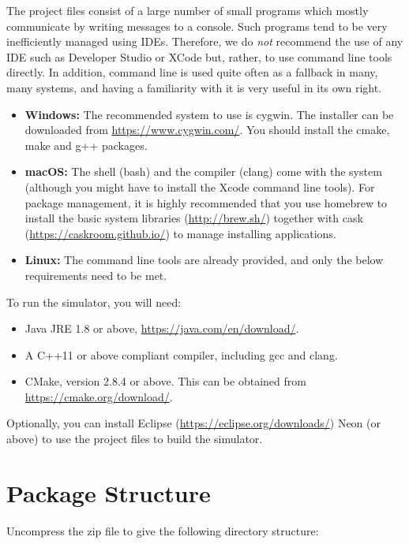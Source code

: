\documentclass[a4paper]{article}
\begin{document}
The project files consist of a large number of small programs which mostly
communicate by writing messages to a console. Such programs tend to be very
inefficiently managed using IDEs. Therefore, we do \emph{not\/} recommend the
use of any IDE such as Developer Studio or XCode but, rather, to use command
line tools directly. In addition, command line is used quite often as a fallback
in many, many systems, and having a familiarity with it is very useful in its
own right.

\begin{itemize}
\item {\bfseries Windows:} The recommended system to use is
  cygwin. The installer can be downloaded from
  \url{https://www.cygwin.com/}. You should install the cmake, make
  and g++ packages.
\item {\bfseries macOS:} The shell (bash) and the compiler (clang)
  come with the system (although you might have to install the Xcode
  command line tools). For package management, it is highly
  recommended that you use homebrew to install the basic system
  libraries (\url{http://brew.sh/}) together with cask
  (\url{https://caskroom.github.io/}) to manage installing
  applications.
\item {\bfseries Linux:} The command line tools are already provided,
  and only the below requirements need to be met.
\end{itemize}

To run the simulator, you will need:

\begin{itemize}
\item Java JRE 1.8 or above, \url{https://java.com/en/download/}.
\item A C++11 or above compliant compiler, including gcc and
  clang.
\item CMake, version 2.8.4 or above. This can be obtained from
  \url{https://cmake.org/download/}.
\end{itemize}

Optionally, you can install Eclipse
(\url{https://eclipse.org/downloads/}) Neon (or above) to use the
project files to build the simulator.

\section{Package Structure}

Uncompress the zip file to give the following directory structure:
\end{document}
